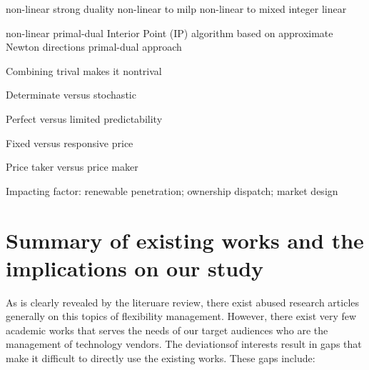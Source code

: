 non-linear strong duality non-linear to milp \cite{HenriquezAuba2017}
non-linear to mixed integer linear \cite{Mohsenian-Rad2016}

non-linear primal-dual Interior Point (IP) algorithm based on approximate Newton directions \cite{Storage2015}
primal-dual approach \cite{Zhang2016}



Combining trival makes it nontrival

Determinate versus stochastic 

Perfect versus limited predictability 

Fixed versus responsive price

Price taker versus price maker

Impacting factor: renewable penetration; ownership dispatch; market design













\section{Summary of existing works and the implications on our study}




As is clearly revealed by the literuare review, there exist abused research articles generally on this topics of flexibility management. However, there exist very few academic works that serves the needs of our target audiences who are the management of technology vendors. The deviationsof interests result in gaps that make it difficult to directly use the existing works. These gaps include:

